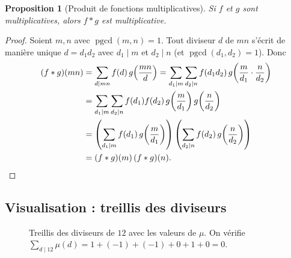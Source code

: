 \documentclass[12pt,a4paper,openany]{book}
\theoremstyle{definition}
\theoremstyle{plain}
\newtheorem{proposition}[definition]{Proposition}
\theoremstyle{remark}
\DeclareMathOperator{\pgcd}{pgcd}
\begin{document}
\begin{proposition}[Produit de fonctions multiplicatives]
\label{prop:produit-multiplicatives}
Si $f$ et $g$ sont multiplicatives, alors $f * g$ est multiplicative.
\end{proposition}

\begin{proof}
Soient $m, n$ avec $\pgcd(m,n) = 1$. Tout diviseur $d$ de $mn$ s'écrit de manière unique
$d = d_1 d_2$ avec $d_1 \mid m$ et $d_2 \mid n$ (et $\pgcd(d_1, d_2) = 1$). Donc
\begin{align*}
  (f*g)(mn) &= \sum_{d \mid mn} f(d)\, g\!\left(\frac{mn}{d}\right)
    = \sum_{d_1 \mid m} \sum_{d_2 \mid n} f(d_1 d_2)\, g\!\left(\frac{m}{d_1}
      \cdot \frac{n}{d_2}\right) \\
    &= \sum_{d_1 \mid m} \sum_{d_2 \mid n} f(d_1)f(d_2)\, g\!\left(\frac{m}{d_1}\right)
      g\!\left(\frac{n}{d_2}\right) \\
    &= \left(\sum_{d_1 \mid m} f(d_1)\, g\!\left(\frac{m}{d_1}\right)\right)
       \left(\sum_{d_2 \mid n} f(d_2)\, g\!\left(\frac{n}{d_2}\right)\right) \\
    &= (f*g)(m)\,(f*g)(n). \qedhere
\end{align*}
\end{proof}

\subsection{Visualisation : treillis des diviseurs}

\begin{figure}[ht]
\centering
{}
\caption{Treillis des diviseurs de $12$ avec les valeurs de $\mu$.
On vérifie $\sum_{d \mid 12} \mu(d) = 1 + (-1) + (-1) + 0 + 1 + 0 = 0$.}
\label{fig:treillis-diviseurs-12}
\end{figure}
\end{document}
